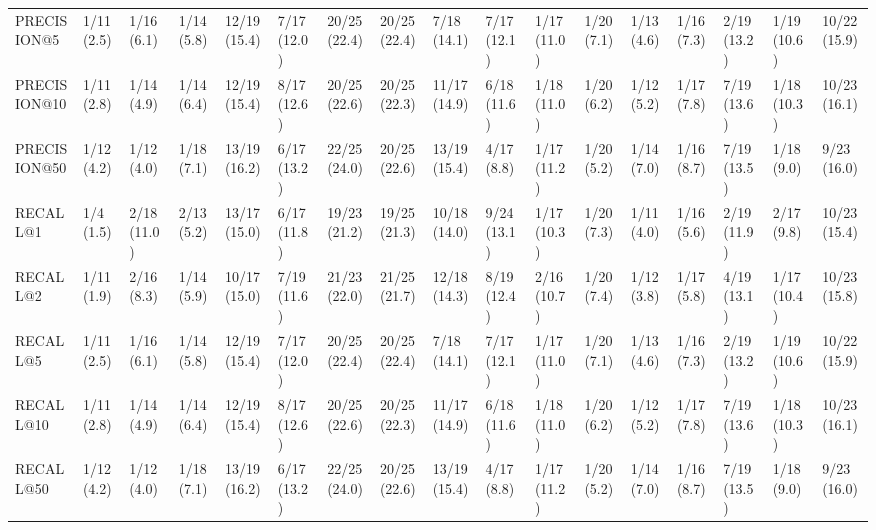\begin{tabular}{lllllllllllllllll}
PRECISION@5                 &     1/11 (2.5) &     1/16 (6.1) &    1/14 (5.8) &   12/19 (15.4) &    7/17 (12.0) &      20/25 (22.4) &   20/25 (22.4) &   7/18 (14.1) &    7/17 (12.1) &  1/17 (11.0) &  1/20 (7.1) &     1/13 (4.6) &            1/16 (7.3) &         2/19 (13.2) &  1/19 (10.6) &  10/22 (15.9) \\
PRECISION@10                &     1/11 (2.8) &     1/14 (4.9) &    1/14 (6.4) &   12/19 (15.4) &    8/17 (12.6) &      20/25 (22.6) &   20/25 (22.3) &  11/17 (14.9) &    6/18 (11.6) &  1/18 (11.0) &  1/20 (6.2) &     1/12 (5.2) &            1/17 (7.8) &         7/19 (13.6) &  1/18 (10.3) &  10/23 (16.1) \\
PRECISION@50                &     1/12 (4.2) &     1/12 (4.0) &    1/18 (7.1) &   13/19 (16.2) &    6/17 (13.2) &      22/25 (24.0) &   20/25 (22.6) &  13/19 (15.4) &     4/17 (8.8) &  1/17 (11.2) &  1/20 (5.2) &     1/14 (7.0) &            1/16 (8.7) &         7/19 (13.5) &   1/18 (9.0) &   9/23 (16.0) \\
RECALL@1                    &      1/4 (1.5) &    2/18 (11.0) &    2/13 (5.2) &   13/17 (15.0) &    6/17 (11.8) &      19/23 (21.2) &   19/25 (21.3) &  10/18 (14.0) &    9/24 (13.1) &  1/17 (10.3) &  1/20 (7.3) &     1/11 (4.0) &            1/16 (5.6) &         2/19 (11.9) &   2/17 (9.8) &  10/23 (15.4) \\
RECALL@2                    &     1/11 (1.9) &     2/16 (8.3) &    1/14 (5.9) &   10/17 (15.0) &    7/19 (11.6) &      21/23 (22.0) &   21/25 (21.7) &  12/18 (14.3) &    8/19 (12.4) &  2/16 (10.7) &  1/20 (7.4) &     1/12 (3.8) &            1/17 (5.8) &         4/19 (13.1) &  1/17 (10.4) &  10/23 (15.8) \\
RECALL@5                    &     1/11 (2.5) &     1/16 (6.1) &    1/14 (5.8) &   12/19 (15.4) &    7/17 (12.0) &      20/25 (22.4) &   20/25 (22.4) &   7/18 (14.1) &    7/17 (12.1) &  1/17 (11.0) &  1/20 (7.1) &     1/13 (4.6) &            1/16 (7.3) &         2/19 (13.2) &  1/19 (10.6) &  10/22 (15.9) \\
RECALL@10                   &     1/11 (2.8) &     1/14 (4.9) &    1/14 (6.4) &   12/19 (15.4) &    8/17 (12.6) &      20/25 (22.6) &   20/25 (22.3) &  11/17 (14.9) &    6/18 (11.6) &  1/18 (11.0) &  1/20 (6.2) &     1/12 (5.2) &            1/17 (7.8) &         7/19 (13.6) &  1/18 (10.3) &  10/23 (16.1) \\
RECALL@50                   &     1/12 (4.2) &     1/12 (4.0) &    1/18 (7.1) &   13/19 (16.2) &    6/17 (13.2) &      22/25 (24.0) &   20/25 (22.6) &  13/19 (15.4) &     4/17 (8.8) &  1/17 (11.2) &  1/20 (5.2) &     1/14 (7.0) &            1/16 (8.7) &         7/19 (13.5) &   1/18 (9.0) &   9/23 (16.0) \\

\end{tabular}
